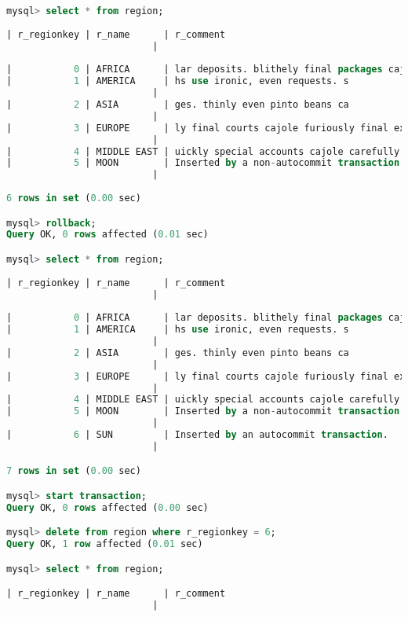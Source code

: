 \documentclass{article}
\begin{document}
\begin{lstlisting}[language=sql]
mysql> select * from region;
 
| r_regionkey | r_name      | r_comment
                          |
 
|           0 | AFRICA      | lar deposits. blithely final packages cajole. regular waters are final requests. regular accounts are according to  |
|           1 | AMERICA     | hs use ironic, even requests. s
                          |
|           2 | ASIA        | ges. thinly even pinto beans ca
                          |
|           3 | EUROPE      | ly final courts cajole furiously final excuse
                          |
|           4 | MIDDLE EAST | uickly special accounts cajole carefully blithely close requests. carefully final asymptotes haggle furiousl        |
|           5 | MOON        | Inserted by a non-autocommit transaction.
                          |
 
6 rows in set (0.00 sec)

mysql> rollback;
Query OK, 0 rows affected (0.01 sec)

mysql> select * from region;
 
| r_regionkey | r_name      | r_comment
                          |
 
|           0 | AFRICA      | lar deposits. blithely final packages cajole. regular waters are final requests. regular accounts are according to  |
|           1 | AMERICA     | hs use ironic, even requests. s
                          |
|           2 | ASIA        | ges. thinly even pinto beans ca
                          |
|           3 | EUROPE      | ly final courts cajole furiously final excuse
                          |
|           4 | MIDDLE EAST | uickly special accounts cajole carefully blithely close requests. carefully final asymptotes haggle furiousl        |
|           5 | MOON        | Inserted by a non-autocommit transaction.
                          |
|           6 | SUN         | Inserted by an autocommit transaction.
                          |

7 rows in set (0.00 sec)

mysql> start transaction;
Query OK, 0 rows affected (0.00 sec)

mysql> delete from region where r_regionkey = 6;
Query OK, 1 row affected (0.01 sec)

mysql> select * from region;

| r_regionkey | r_name      | r_comment
                          |


\end{lstlisting}
\end{document}
